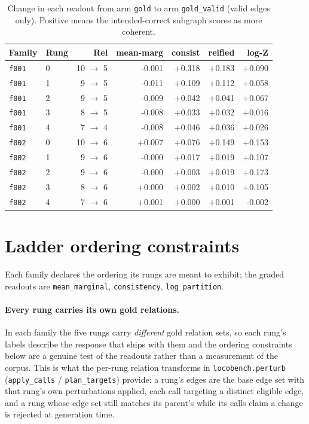 \documentclass[11pt]{article}
\begin{document}
\begin{table}[htbp]
\centering
\small
\caption{Change in each readout from arm \texttt{gold} to arm \texttt{gold\_valid} (valid edges only). Positive means the intended-correct subgraph scores as more coherent.}
\label{tab:arm-delta}
\begin{tabular}{llrrrrr}
\toprule
Family & Rung & Rel & \textbf{mean-marg} & \textbf{consist} & \textbf{reified} & \textbf{log-Z} \\
\midrule
\texttt{f001} & 0 & 10 $\to$ 5 & -0.001 & +0.318 & +0.183 & +0.090 \\
\texttt{f001} & 1 & 9 $\to$ 5 & -0.011 & +0.109 & +0.112 & +0.058 \\
\texttt{f001} & 2 & 9 $\to$ 5 & -0.009 & +0.042 & +0.041 & +0.067 \\
\texttt{f001} & 3 & 8 $\to$ 5 & -0.008 & +0.033 & +0.032 & +0.016 \\
\texttt{f001} & 4 & 7 $\to$ 4 & -0.008 & +0.046 & +0.036 & +0.026 \\
\texttt{f002} & 0 & 10 $\to$ 6 & +0.007 & +0.076 & +0.149 & +0.153 \\
\texttt{f002} & 1 & 9 $\to$ 6 & -0.000 & +0.017 & +0.019 & +0.107 \\
\texttt{f002} & 2 & 9 $\to$ 6 & -0.000 & +0.003 & +0.019 & +0.173 \\
\texttt{f002} & 3 & 8 $\to$ 6 & +0.000 & +0.002 & +0.010 & +0.105 \\
\texttt{f002} & 4 & 7 $\to$ 6 & +0.001 & +0.000 & +0.001 & -0.002 \\
\bottomrule
\end{tabular}
\end{table}

\section{Ladder ordering constraints}\label{sec:ladder}

Each family declares the ordering its rungs are meant to exhibit; the graded readouts are \texttt{mean\_marginal}, \texttt{consistency}, \texttt{log\_partition}.

\paragraph{Every rung carries its own gold relations.} In each family the five rungs carry \emph{different} gold relation sets, so each rung's labels describe the response that ships with them and the ordering constraints below are a genuine test of the readouts rather than a measurement of the corpus. This is what the per-rung relation transforms in \texttt{locobench.perturb} (\texttt{apply\_calls} / \texttt{plan\_targets}) provide: a rung's edges are the base edge set with that rung's own perturbations applied, each call targeting a distinct eligible edge, and a rung whose edge set still matches its parent's while its calls claim a change is rejected at generation time.
\end{document}
